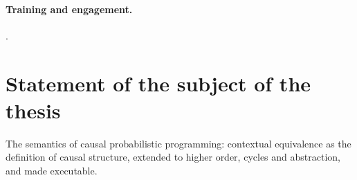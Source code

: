 \paragraph{Training and engagement.} .

\section{Statement of the subject of the thesis}

The semantics of causal probabilistic programming: contextual equivalence as the definition of causal structure, extended to higher order, cycles and abstraction, and made executable.
